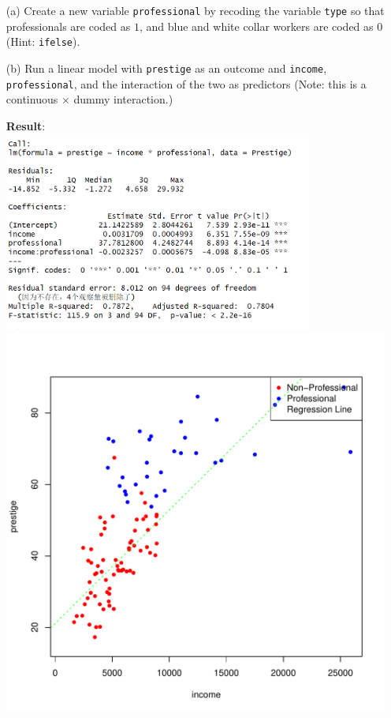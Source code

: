 \documentclass[12pt,letterpaper]{article}
\begin{document}
\newpage
\begin{enumerate}
	
	\item [(a)]
	Create a new variable \texttt{professional} by recoding the variable \texttt{type} so that professionals are coded as $1$, and blue and white collar workers are coded as $0$ (Hint: \texttt{ifelse}).
	
	\vspace{.25cm}
	 
	\vspace{.5cm}
	
	
	\item [(b)]
	Run a linear model with \texttt{prestige} as an outcome and \texttt{income}, \texttt{professional}, and the interaction of the two as predictors (Note: this is a continuous $\times$ dummy interaction.)
	
	\vspace{.25cm}
	 
	\textbf{Result}:\\
	\includegraphics[width=0.8\textwidth]{Q1_b1.png}\\
	\includegraphics[width=.85\textwidth]{Q1_b.pdf} 
	

\end{enumerate}
\end{document}

